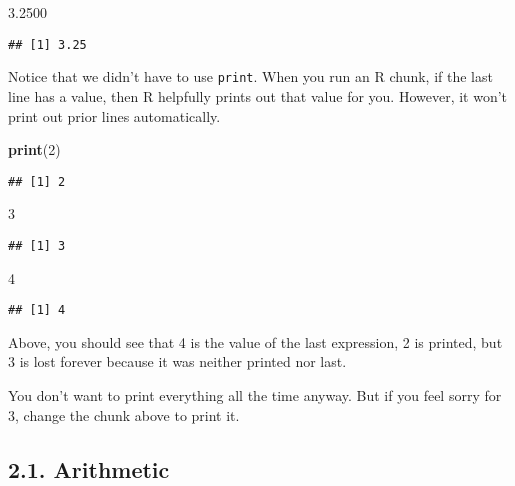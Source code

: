 \documentclass[
]{article}
\newenvironment{Shaded}{\begin{snugshade}}{\end{snugshade}}
\newcommand{\DecValTok}[1]{\textcolor[rgb]{0.00,0.00,0.81}{#1}}
\newcommand{\FloatTok}[1]{\textcolor[rgb]{0.00,0.00,0.81}{#1}}
\newcommand{\FunctionTok}[1]{\textcolor[rgb]{0.13,0.29,0.53}{\textbf{#1}}}
\newcommand{\NormalTok}[1]{#1}
\begin{document}
\begin{Shaded}
\begin{Highlighting}[]
\FloatTok{3.2500}
\end{Highlighting}
\end{Shaded}

\begin{verbatim}
## [1] 3.25
\end{verbatim}

Notice that we didn't have to use \texttt{print}. When you run an R
chunk, if the last line has a value, then R helpfully prints out that
value for you. However, it won't print out prior lines automatically.

\begin{Shaded}
\begin{Highlighting}[]
\FunctionTok{print}\NormalTok{(}\DecValTok{2}\NormalTok{)}
\end{Highlighting}
\end{Shaded}

\begin{verbatim}
## [1] 2
\end{verbatim}

\begin{Shaded}
\begin{Highlighting}[]
\DecValTok{3}
\end{Highlighting}
\end{Shaded}

\begin{verbatim}
## [1] 3
\end{verbatim}

\begin{Shaded}
\begin{Highlighting}[]
\DecValTok{4}
\end{Highlighting}
\end{Shaded}

\begin{verbatim}
## [1] 4
\end{verbatim}

Above, you should see that 4 is the value of the last expression, 2 is
printed, but 3 is lost forever because it was neither printed nor last.

You don't want to print everything all the time anyway. But if you feel
sorry for 3, change the chunk above to print it.

\subsection{2.1. Arithmetic}\label{arithmetic}
\end{document}
